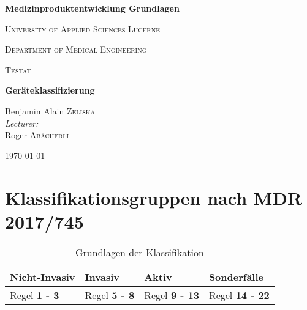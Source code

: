 \documentclass[fontsize=11pt,a4paper] {article}
\begin{document}
	
	
	\begin{titlepage}
		\centering
		
		\vspace{2cm}
		
		{\huge \bfseries Medizinproduktentwicklung Grundlagen\par}
		
		\vspace{1cm}
		
		{\LARGE\scshape University of Applied Sciences Lucerne\par}
		
		\vspace{1cm}
		
		
		{\large\scshape Department of Medical Engineering}
		
		\vspace{2cm}
		
		{\Large\scshape Testat \par}
		
		{\Large \bfseries Geräteklassifizierung \par}
		
		\vspace{2.5cm}
		
		Benjamin Alain \textsc{Zeliska}\\[1.5cm]

		
		
		
		\emph{Lecturer:} \\ [0.3cm]
		{Roger  \textsc{Abächerli} }\\
		
		
		\vfill
		
		{\large \today\par}
	\end{titlepage}
	\tableofcontents
	\newpage
	
	\section{Klassifikationsgruppen nach MDR 2017/745}
	
	 \begin{table}[H]
	 	\caption[Grundlagen nach MDR 2017/745]{Grundlagen der Klassifikation} 
	 	\begin{tabular}{||m{4cm}|m{4cm}|m{4cm}|m{4cm}|} \hline
	 		\textbf{Nicht-Invasiv}	& \textbf{Invasiv} & \textbf{Aktiv} & \textbf{Sonderfälle} 
	 		\\\hline
	 		Regel \textbf{1 - 3} & Regel \textbf{5 - 8} & Regel \textbf{9 - 13} & Regel \textbf{14 - 22} \\\hline
	 	
	 	\end{tabular}
	 \end{table}
	
\end{document}
